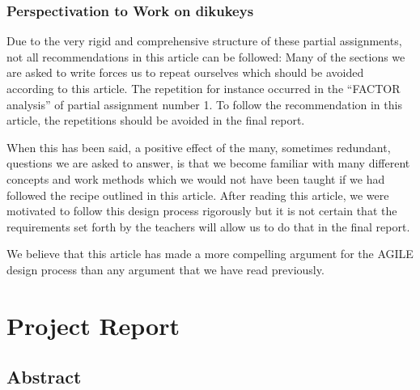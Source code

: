 \documentclass[11pt,a4paper]{report}
\begin{document}
\subsection{Perspectivation to Work on dikukeys}
Due to the very rigid and comprehensive structure of these partial assignments, not all recommendations in this article can be followed: Many of the sections we are asked to write forces us to repeat ourselves which should be avoided according to this article. The repetition for instance occurred in the ``FACTOR analysis'' of partial assignment number 1. To follow the recommendation in this article, the repetitions should be avoided in the final report. 

When this has been said, a positive effect of the many, sometimes redundant, questions we are asked to answer, is that we become familiar with many different concepts and work methods which we would not have been taught if we had followed the recipe outlined in this article. After reading this article, we were motivated to follow this design process rigorously but it is not certain that the requirements set forth by the teachers will allow us to do that in the final report.

We believe that this article has made a more compelling argument for the AGILE design process than any argument that we have read previously.
\chapter{Project Report}\label{ch:Project_Report}

\section{Abstract}\label{sec:Abstract}
\end{document}

